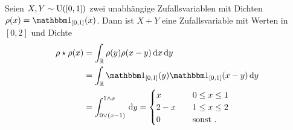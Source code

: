 \begin{example}
	Seien $X,Y \sim \operatorname{U}([0,1])$ zwei unabhängige Zufallsvariablen mit Dichten $\rho(x) = \indi_{[0,1]}(x)$. Dann ist $X+Y$ eine Zufallsvariable mit Werten in $[0,2]$ und Dichte
	\begin{align*}
		\rho \star \rho(x) &= \int_{\R} \rho(y) \rho(x-y) \d x \d y\\
		&= \int_{\R} \indi_{[0,1]}(y) \indi_{[0,1]}(x-y) \d y\\
		&= \int_{0 \vee (x-1)}^{1 \wedge x} \d y= \begin{cases}
		x &\quad 0 \le x \le 1\\
		2 -x &\quad 1 \le x \le 2\\
		0 &\quad \sonst.
		\end{cases}
	\end{align*} %
%	
%	
\end{example}
